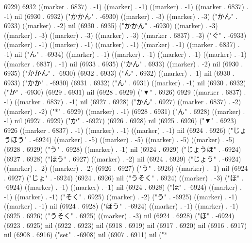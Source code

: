 6929) 6932 ((marker . 6837) . -1) ((marker) . -1) ((marker) . -1) ((marker . 6837) . -1) nil (6930 . 6932) ("かかん" . -6930) ((marker) . -3) ((marker) . -3) ("かん" . 6933) ((marker) . -2) nil (6930 . 6935) ("かかん" . -6930) ((marker) . -3) ((marker) . -3) ((marker) . -3) ((marker) . -3) ((marker . 6837) . -3) ("ぐ" . -6933) ((marker) . -1) ((marker) . -1) ((marker) . -1) ((marker) . -1) ((marker . 6837) . -1) nil ("ん" . -6934) ((marker) . -1) ((marker) . -1) ((marker) . -1) ((marker) . -1) ((marker . 6837) . -1) nil (6933 . 6935) ("かん" . 6933) ((marker) . -2) nil (6930 . 6935) ("かかん" . -6930) (6932 . 6933) ("ん" . 6932) ((marker) . -1) nil (6930 . 6933) ("かか" . -6930) (6931 . 6932) ("ん" . 6931) ((marker) . -1) nil (6930 . 6932) ("か" . -6930) (6929 . 6931) nil (6928 . 6929) ("▼" . 6926) 6929 ((marker . 6837) . -1) ((marker . 6837) . -1) nil (6927 . 6928) ("かん" . 6927) ((marker . 6837) . -2) ((marker) . -2) ("*" . 6929) ((marker) . -1) (6928 . 6931) ("ん" . 6928) ((marker) . -1) nil (6927 . 6929) ("か" . -6927) (6926 . 6928) nil (6925 . 6926) ("▼" . 6923) 6926 ((marker . 6837) . -1) ((marker) . -1) ((marker) . -1) nil (6924 . 6926) ("じょうほう" . -6924) ((marker) . -5) ((marker) . -5) ((marker) . -5) ((marker) . -5) (6928 . 6929) ("う" . 6928) ((marker) . -1) nil (6924 . 6929) ("じょうほ" . -6924) (6927 . 6928) ("ほう" . 6927) ((marker) . -2) nil (6924 . 6929) ("じょう" . -6924) ((marker) . -2) ((marker) . -2) (6926 . 6927) ("う" . 6926) ((marker) . -1) nil (6924 . 6927) ("じょ" . -6924) (6924 . 6926) nil ("うそく" . 6924) ((marker) . -3) ("ほ" . -6924) ((marker) . -1) ((marker) . -1) nil (6924 . 6928) ("ほ" . -6924) ((marker) . -1) ((marker) . -1) ("そく" . 6925) ((marker) . -2) ("う" . -6925) ((marker) . -1) ((marker) . -1) nil (6924 . 6928) ("ほう" . -6924) ((marker) . -1) ((marker) . -1) (6925 . 6926) ("うそく" . 6925) ((marker) . -3) nil (6924 . 6928) ("ほ" . -6924) (6923 . 6925) nil (6922 . 6923) nil (6918 . 6919) nil (6917 . 6920) nil (6916 . 6917) nil (6908 . 6916) ("set" . -6908) nil (6907 . 6911) nil ("*
